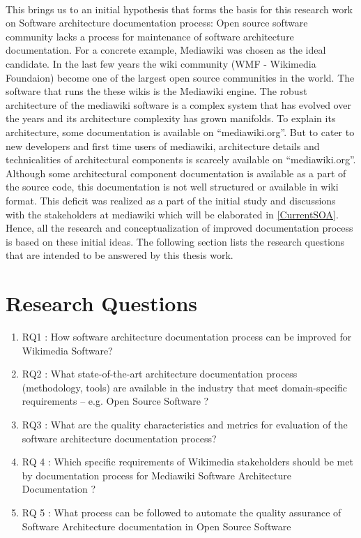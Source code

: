 \\\indent This brings us to an initial hypothesis that forms the basis for this research work on Software architecture documentation process: Open source software community lacks a process for maintenance of software architecture documentation. 
For a concrete example, Mediawiki was chosen as the ideal candidate. In the last few years the wiki community (WMF - Wikimedia Foundaion) become one of the largest open source communities in the world. The software that runs the these wikis is the Mediawiki engine. The robust architecture of the mediawiki software is a complex system that has evolved over the years and its architecture complexity has grown manifolds. To explain its architecture, some documentation is available on “mediawiki.org”. But to cater to new developers and first time users of mediawiki, architecture details and technicalities of architectural components is scarcely available on “mediawiki.org”. Although some architectural component documentation is available as a part of the source code, this documentation is not well structured or available in wiki format. This deficit was realized as a part of the initial study and discussions with the stakeholders at mediawiki which will be elaborated in \autoref{CurrentSOA}. Hence, all the research and conceptualization of improved documentation process is based on these initial ideas. The following section lists the research questions that are intended to be answered by this thesis work.

\section{Research Questions}
\begin{enumerate}
\item RQ1\label{RQ1}  : How software architecture documentation process can be improved for Wikimedia Software?
\item RQ2\label{RQ2} : What state-of-the-art architecture documentation process (methodology, tools) are available in the industry that meet domain-specific requirements – e.g. Open Source Software ?
\item RQ3\label{RQ3} : What are the quality characteristics and metrics for evaluation of the software architecture documentation process?
\item RQ 4\label{RQ4} : Which specific requirements of Wikimedia stakeholders should be met by documentation process for Mediawiki Software Architecture Documentation ?
\item RQ 5\label{RQ5} : What process can be followed to automate the quality assurance of Software Architecture documentation in Open Source Software
\end{enumerate}

